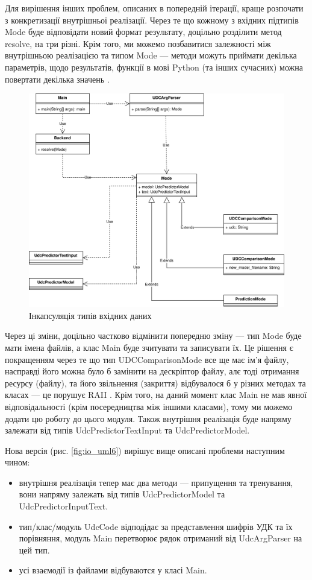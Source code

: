 \documentclass[14pt]{extarticle}
\begin{document}
  Для вирішення інших проблем, описаних в попередній ітерації,
  краще розпочати з конкретизації внутрішньої реалізації.
  Через те що кожному з вхідних підтипів Mode буде відповідати новий формат
  результату, доцільно розділити метод resolve, на три різні.
  Крім того, ми можемо позбавитися залежності між
  внутрішньою реалізацією та типом Mode ---
  методи можуть приймати декілька параметрів,
  щодо результатів, функції в мові Python (та інших сучасних)
  можна повертати декілька значень
  \cite{python3_tuples_and_sequences}.

  \begin{figure}
    \centering
    \includegraphics[height=0.6\textwidth]{io_uml5.drawio.png}    
    \caption{Інкапсуляція типів вхідних даних}
    \label{fig:io_uml5}
  \end{figure}

  Через ці зміни, доцільно частково відмінити попередню зміну ---
  тип Mode буде мати імена файлів, а клас Main буде зчитувати та записувати їх.
  Це рішення є покращенням через те що тип
  UDCComparisonMode все ще має ім'я файлу,
  насправді його можна було б замінити на дескріптор файлу,
  алє тоді отримання ресурсу (файлу),
  та його звільнення (закриття) відбувалося б у різних методах та класах ---
  це порушує RAII \cite{wiki_raii}.
  Крім того, на даний момент клас Main не мав явної відповідальності
  (крім посередництва між іншими класами),
  тому ми можемо додати цю роботу до цього модуля.
  Також внутрішня реалізація буде напряму залежати
  від типів UdcPredictorTextInput та UdcPredictorModel.

  Нова версія (рис. \ref{fig:io_uml6}) вирішує вище описані проблеми
  наступним чином:
  \begin{itemize}[labelindent=\dimexpr{}\relax, leftmargin=*]
    \item внутрішня реалізація тепер має два методи ---
    припущення та тренування,
    вони напряму залежать від типів UdcPredictorModel та \\ UdcPredictorInputText.
    \item тип/клас/модуль UdcCode відподідає за представлення шифрів УДК
    та їх порівняння,
    модуль Main перетворює рядок отриманий від UdcArgParser на цей тип.
    \item усі взаємодії із файлами відбуваются у класі Main.
  \end{itemize}
\end{document}
